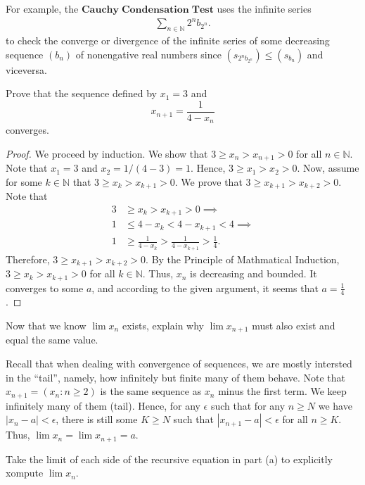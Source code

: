 \documentclass[12pt]{article}
\newcommand{\N}{\mathbb{N}}
\newenvironment{problem}[2][Problem]{\begin{trivlist} \item[\hskip \labelsep {\bfseries #1}\hskip \labelsep {\bfseries #2.}]}{\end{trivlist}}
\newenvironment{solution}[1][Solution]{\begin{trivlist} \item[\hskip \labelsep {\bfseries #1}]}{\end{trivlist}}
\begin{document}
For example, the  $\mathbf{Cauchy \; Condensation \; Test}$ uses the infinite series
\begin{align*}
  \sum_{n\in\N} 2^{n}b_{2^{n}}.
\end{align*}
to check the converge or divergence of the infinite series of some decreasing sequence $(b_{n})$ of nonengative real numbers since $(s_{2^{n}b_{2^{n}}}) \leq (s_{b_{n}})$ and viceversa.
\begin{problem}{2.4.1}
\begin{enumerate}
  \item Prove that the sequence defined by $x_{1} = 3$ and 
\begin{equation*}
  x_{n+1} = \frac{1}{4-x_{n}}
\end{equation*}
converges.
\begin{proof}
  We proceed by induction. We show that $3\geq x_{n} > x_{n+1} >0$ for all $n\in \N$. Note that $x_{1} = 3$ and $x_{2} = 1/(4-3) = 1$. Hence, $3\geq x_{1} > x_{2} > 0$. Now, assume for some $k\in \N$ that $3\geq x_{k} > x_{k+1} > 0$. We prove that $3\geq x_{k+1} > x_{k+2}>0$. Note that
\begin{align*}
  3&\geq x_{k} > x_{k+1} >0 \implies\\
  1&\leq 4-x_{k} < 4-x_{k+1} < 4 \implies\\
  1&\geq \frac{1}{4-x_{k}} > \frac{1}{4-x_{k+1}} > \frac{1}{4}.
\end{align*}
Therefore, $3\geq x_{k+1} > x_{k+2} >0$. By the Principle of Mathmatical Induction, $3\geq x_{k}>x_{k+1}>0$ for all $k\in \N$. Thus, $x_{n}$ is decreasing and bounded. It converges to some $a$, and according to the given argument, it seems that $a=\frac{1}{4}$.
\end{proof}
\item Now that we know $\lim x_{n}$ exists, explain why $\lim x_{n+1}$ must also exist and equal the same value.
\begin{solution}
  Recall that when dealing with convergence of sequences, we are mostly intersted in the ``tail'', namely, how infinitely but finite many of them behave. Note that $x_{n+1} = \left(x_{n}:n\geq 2 \right)$ is the same sequence as $x_{n}$ minus the first term. We keep infinitely many of them (tail). Hence, for any $\epsilon$ such that for any $n\geq N$ we have $|x_{n} -a|<\epsilon$, there is still some $K\geq N$ such that $|x_{n+1}-a|<\epsilon$ for all $n\geq K$. Thus, $\lim x_{n} = \lim x_{n+1}=a$.
\end{solution}
\item Take the limit of each side of the recursive equation in part (a) to explicitly xompute $\lim x_{n}$. 

\end{enumerate}
\end{problem}
\end{document}
